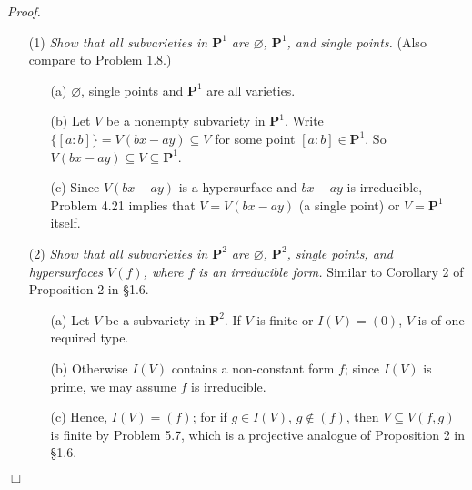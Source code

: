 \documentclass{article}
\begin{document}
\emph{Proof.}
\begin{enumerate}
\item[(1)]
  \emph{Show that all subvarieties in $\mathbf{P}^{1}$ are
  $\varnothing$, $\mathbf{P}^{1}$, and single points.}
  (Also compare to Problem 1.8.)
  \begin{enumerate}
  \item[(a)]
    $\varnothing$, single points and $\mathbf{P}^{1}$ are all varieties.

  \item[(b)]
    Let $V$ be a nonempty subvariety in $\mathbf{P}^{1}$.
    Write $\{[a:b]\} = V(bx - ay) \subseteq V$ for some point $[a:b] \in \mathbf{P}^{1}$.
    So $V(bx - ay) \subseteq V \subseteq \mathbf{P}^{1}$.

  \item[(c)]
    Since $V(bx - ay)$ is a hypersurface and $bx-ay$ is irreducible,
    Problem 4.21 implies that
    $V = V(bx - ay)$ (a single point) or $V = \mathbf{P}^{1}$ itself.
  \end{enumerate}

\item[(2)]
  \emph{Show that all subvarieties in $\mathbf{P}^{2}$ are
  $\varnothing$, $\mathbf{P}^{2}$, single points, and hypersurfaces $V(f)$,
  where $f$ is an irreducible form.}
  Similar to Corollary 2 of Proposition 2 in \S 1.6.
  \begin{enumerate}
  \item[(a)]
    Let $V$ be a subvariety in $\mathbf{P}^{2}$.
    If $V$ is finite or $I(V) = (0)$, $V$ is of one required type.

  \item[(b)]
    Otherwise $I(V)$ contains a non-constant form $f$;
    since $I(V)$ is prime, we may assume $f$ is irreducible.

  \item[(c)]
    Hence, $I(V) = (f)$; for if $g \in I(V)$, $g \not\in (f)$,
    then $V \subseteq V(f,g)$ is finite by Problem 5.7,
    which is a projective analogue of Proposition 2 in \S 1.6.
  \end{enumerate}
\end{enumerate}
$\Box$ \\\\



\end{document}
